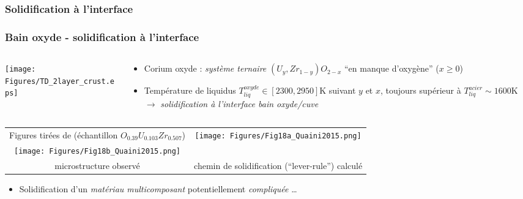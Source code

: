 \subsubsection{Solidification à l'interface}
\begin{frame}[fragile]
\frametitle{Bain oxyde - solidification à l'interface}
\begin{columns}[T]
    \begin{column}{0.25\textwidth}
\centering \texttt{[image: Figures/TD\_2layer\_crust.eps]}
    \end{column}
    \begin{column}{0.75\textwidth}
\begin{itemize}
\item Corium oxyde : \emph{système ternaire} $\left(U_y,Zr_{1-y}\right)O_{2-x}$ ``en manque d'oxygène'' ($x\ge0$)
\item Température de liquidus $T_{liq}^{oxyde} \in [2300, 2950]$K suivant $y$ et $x$, toujours supérieur à $T_{liq}^{acier} \sim 1600$K $\rightarrow$ \emph{solidification à l'interface bain oxyde/cuve}
    \end{itemize}
    \end{column}
\end{columns}
\begin{minipage}{0.7\textwidth}
\begin{tabular}{cc}
\tiny{Figures tirées de \cite{Quaini2015} (échantillon $O_{0.39}U_{0.103}Zr_{0.507}$}) & \multirow{2}{*}{\texttt{[image: Figures/Fig18a\_Quaini2015.png]}} \\
\texttt{[image: Figures/Fig18b\_Quaini2015.png]} & \\
\tiny{microstructure observé} & \tiny{chemin de solidification (``lever-rule'') calculé}
\end{tabular}
\end{minipage}
\begin{itemize}
\item Solidification d'un \emph{matériau multicomposant} potentiellement \emph{compliquée} \dots
\end{itemize}
\end{frame}
